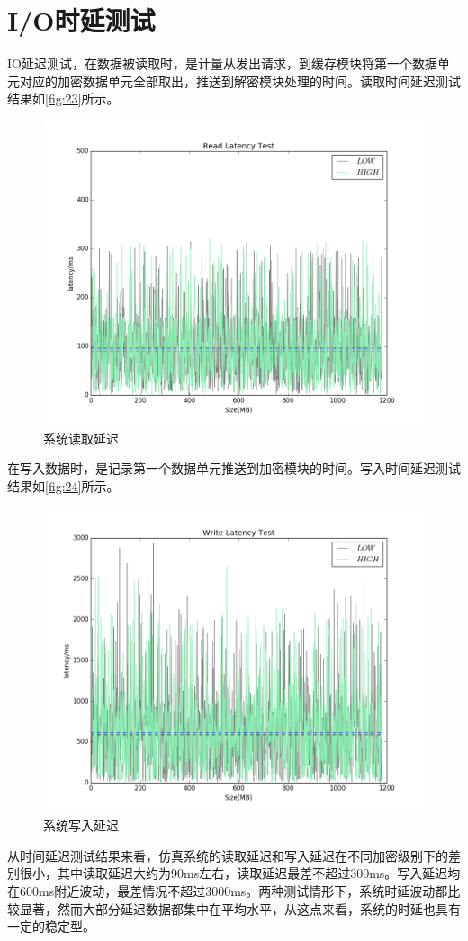 \section{I/O时延测试}
IO延迟测试，在数据被读取时，是计量从发出请求，到缓存模块将第一个数据单元对应的加密数据单元全部取出，推送到解密模块处理的时间。读取时间延迟测试结果如\autoref{fig:23}所示。
\begin{figure}[H]
	\centering
	\includegraphics[width=1\textwidth]{Pics/figure_lat_r.png}
	\caption{系统读取延迟}
	\label{fig:23}
\end{figure}
在写入数据时，是记录第一个数据单元推送到加密模块的时间。写入时间延迟测试结果如\autoref{fig:24}所示。
\begin{figure}[H]
	\centering
	\includegraphics[width=1\textwidth]{Pics/figure_lat_w.png}
	\caption{系统写入延迟}
	\label{fig:24}
\end{figure}
从时间延迟测试结果来看，仿真系统的读取延迟和写入延迟在不同加密级别下的差别很小，其中读取延迟大约为90ms左右，读取延迟最差不超过300ms。写入延迟均在600ms附近波动，最差情况不超过3000ms。两种测试情形下，系统时延波动都比较显著，然而大部分延迟数据都集中在平均水平，从这点来看，系统的时延也具有一定的稳定型。
